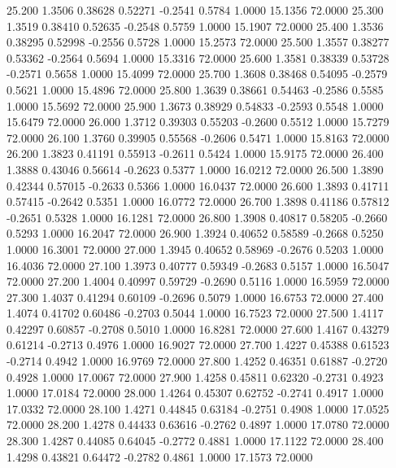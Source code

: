   25.200   1.3506   0.38628   0.52271  -0.2541   0.5784   1.0000  15.1356  72.0000
  25.300   1.3519   0.38410   0.52635  -0.2548   0.5759   1.0000  15.1907  72.0000
  25.400   1.3536   0.38295   0.52998  -0.2556   0.5728   1.0000  15.2573  72.0000
  25.500   1.3557   0.38277   0.53362  -0.2564   0.5694   1.0000  15.3316  72.0000
  25.600   1.3581   0.38339   0.53728  -0.2571   0.5658   1.0000  15.4099  72.0000
  25.700   1.3608   0.38468   0.54095  -0.2579   0.5621   1.0000  15.4896  72.0000
  25.800   1.3639   0.38661   0.54463  -0.2586   0.5585   1.0000  15.5692  72.0000
  25.900   1.3673   0.38929   0.54833  -0.2593   0.5548   1.0000  15.6479  72.0000
  26.000   1.3712   0.39303   0.55203  -0.2600   0.5512   1.0000  15.7279  72.0000
  26.100   1.3760   0.39905   0.55568  -0.2606   0.5471   1.0000  15.8163  72.0000
  26.200   1.3823   0.41191   0.55913  -0.2611   0.5424   1.0000  15.9175  72.0000
  26.400   1.3888   0.43046   0.56614  -0.2623   0.5377   1.0000  16.0212  72.0000
  26.500   1.3890   0.42344   0.57015  -0.2633   0.5366   1.0000  16.0437  72.0000
  26.600   1.3893   0.41711   0.57415  -0.2642   0.5351   1.0000  16.0772  72.0000
  26.700   1.3898   0.41186   0.57812  -0.2651   0.5328   1.0000  16.1281  72.0000
  26.800   1.3908   0.40817   0.58205  -0.2660   0.5293   1.0000  16.2047  72.0000
  26.900   1.3924   0.40652   0.58589  -0.2668   0.5250   1.0000  16.3001  72.0000
  27.000   1.3945   0.40652   0.58969  -0.2676   0.5203   1.0000  16.4036  72.0000
  27.100   1.3973   0.40777   0.59349  -0.2683   0.5157   1.0000  16.5047  72.0000
  27.200   1.4004   0.40997   0.59729  -0.2690   0.5116   1.0000  16.5959  72.0000
  27.300   1.4037   0.41294   0.60109  -0.2696   0.5079   1.0000  16.6753  72.0000
  27.400   1.4074   0.41702   0.60486  -0.2703   0.5044   1.0000  16.7523  72.0000
  27.500   1.4117   0.42297   0.60857  -0.2708   0.5010   1.0000  16.8281  72.0000
  27.600   1.4167   0.43279   0.61214  -0.2713   0.4976   1.0000  16.9027  72.0000
  27.700   1.4227   0.45388   0.61523  -0.2714   0.4942   1.0000  16.9769  72.0000
  27.800   1.4252   0.46351   0.61887  -0.2720   0.4928   1.0000  17.0067  72.0000
  27.900   1.4258   0.45811   0.62320  -0.2731   0.4923   1.0000  17.0184  72.0000
  28.000   1.4264   0.45307   0.62752  -0.2741   0.4917   1.0000  17.0332  72.0000
  28.100   1.4271   0.44845   0.63184  -0.2751   0.4908   1.0000  17.0525  72.0000
  28.200   1.4278   0.44433   0.63616  -0.2762   0.4897   1.0000  17.0780  72.0000
  28.300   1.4287   0.44085   0.64045  -0.2772   0.4881   1.0000  17.1122  72.0000
  28.400   1.4298   0.43821   0.64472  -0.2782   0.4861   1.0000  17.1573  72.0000
